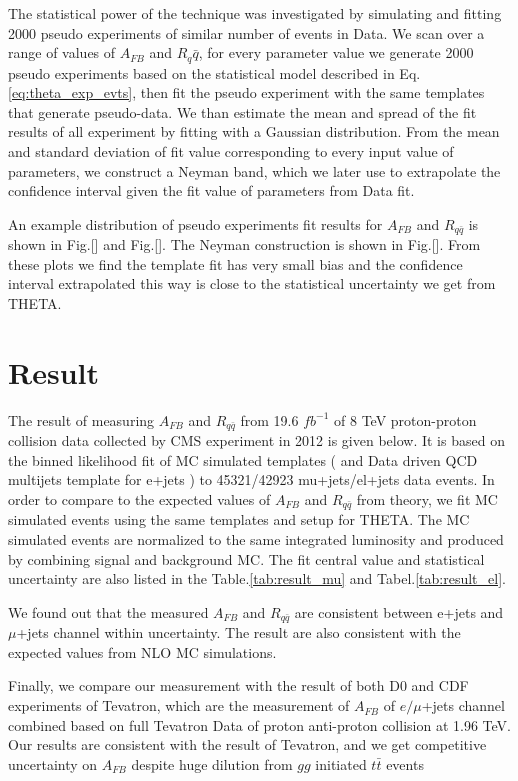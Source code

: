 \documentclass{cmspaperpdf}
\begin{document}
The statistical power of the technique was investigated by simulating and fitting 2000 pseudo experiments of similar number of events in Data. We scan over a range of values of $A_{FB}$ and $R_q\bar{q}$, for every parameter value we generate 2000 pseudo experiments based on the statistical model described in Eq.\ref{eq:theta_exp_evts}, then fit the pseudo experiment with the same templates that generate pseudo-data. We than estimate the mean and spread of the fit results of all experiment by fitting with a Gaussian distribution. From the mean and standard deviation of fit value corresponding to every input value of parameters, we construct a Neyman band, which we later use to extrapolate the confidence interval given the fit value of parameters from Data fit.

An example distribution of pseudo experiments fit results for $A_{FB}$ and $R_{q\bar{q}}$ is shown in Fig.[] and Fig.[]. The Neyman construction is shown in Fig.[]. From these plots we find the template fit has very small bias and the confidence interval extrapolated this way is close to the statistical uncertainty we get from THETA. 

\section{Result}
\label{sec:results}

The result of measuring $A_{FB}$ and $R_{q\bar{q}}$ from 19.6 $fb^{-1}$ of 8 TeV proton-proton collision data collected by CMS experiment in 2012 is given below. It is based on the binned likelihood fit of MC simulated templates ( and Data driven QCD multijets template for e+jets ) to 45321/42923 mu+jets/el+jets data events. In order to compare to the expected values of $A_{FB}$ and $R_{q\bar{q}}$ from theory, we fit MC simulated events using the same templates and setup for THETA. The MC simulated events are normalized to the same integrated luminosity and produced by combining signal and background MC. The fit central value and statistical uncertainty are also listed in the Table.\ref{tab:result_mu} and Tabel.\ref{tab:result_el}.

We found out that the measured $A_{FB}$ and $R_{q\bar{q}}$ are consistent between e+jets and $\mu$+jets channel within uncertainty. The result are also consistent with the expected values from NLO MC simulations.

Finally, we compare our measurement with the result of both D0 and CDF experiments of Tevatron, which are the measurement of $A_{FB}$ of $e/\mu$+jets channel combined based on full Tevatron Data of proton anti-proton collision at 1.96 TeV. Our results are consistent with the result of Tevatron, and we get competitive uncertainty on $A_{FB}$ despite huge dilution from $gg$ initiated $t\bar{t}$ events
\end{document}
